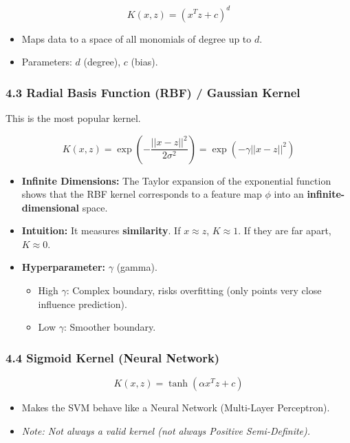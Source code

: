 \documentclass[
  italian,
  11pt,
]{article}
\begin{document}
\[K(x, z) = (x^T z + c)^d\]

\begin{itemize}
\item
  Maps data to a space of all monomials of degree up to \(d\).
\item
  Parameters: \(d\) (degree), \(c\) (bias).
\end{itemize}

\subsubsection{4.3 Radial Basis Function (RBF) / Gaussian
Kernel}\label{radial-basis-function-rbf-gaussian-kernel}

This is the most popular kernel.

\[K(x, z) = \exp\left(-\frac{||x - z||^2}{2\sigma^2}\right) = \exp(-\gamma ||x - z||^2)\]

\begin{itemize}
\item
  \textbf{Infinite Dimensions:} The Taylor expansion of the exponential
  function shows that the RBF kernel corresponds to a feature map
  \(\phi\) into an \textbf{infinite-dimensional} space.
\item
  \textbf{Intuition:} It measures \textbf{similarity}. If
  \(x \approx z\), \(K \approx 1\). If they are far apart,
  \(K \approx 0\).
\item
  \textbf{Hyperparameter:} \(\gamma\) (gamma).

  \begin{itemize}
  \item
    High \(\gamma\): Complex boundary, risks overfitting (only points
    very close influence prediction).
  \item
    Low \(\gamma\): Smoother boundary.
  \end{itemize}
\end{itemize}

\subsubsection{4.4 Sigmoid Kernel (Neural
Network)}\label{sigmoid-kernel-neural-network}

\[K(x, z) = \tanh(\alpha x^T z + c)\]

\begin{itemize}
\item
  Makes the SVM behave like a Neural Network (Multi-Layer Perceptron).
\item
  \emph{Note: Not always a valid kernel (not always Positive
  Semi-Definite).}
\end{itemize}
\end{document}
